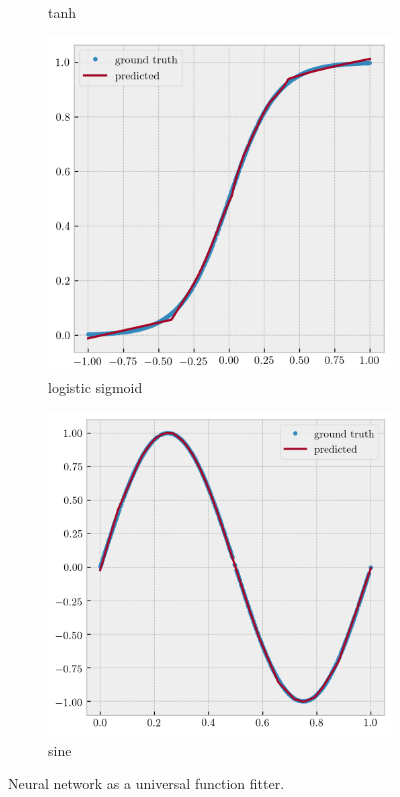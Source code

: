 \documentclass[12pt,a4paper]{article}
\begin{document}
\begin{figure}[htb]
\begin{subfigure}[h!]{0.3\textwidth}
		\caption{tanh}
		\label{fig:tanh}
	\end{subfigure}
	\begin{subfigure}[h!]{0.3\textwidth}
		\centering
		\includegraphics[width=\textwidth]{fit-sigmoid-pred.png}
		\caption{logistic sigmoid}
		\label{fig:sigmoid}
	\end{subfigure}
	\begin{subfigure}[h!]{0.3\textwidth}
		\centering
		\includegraphics[width=\textwidth]{fit-sin1Hz-pred.png}
		\caption{sine}
		\label{fig:sine}
	\end{subfigure}
	\caption{Neural network as a universal function fitter.}
	\label{fig:function-fitter}
\end{figure}
\end{document}
